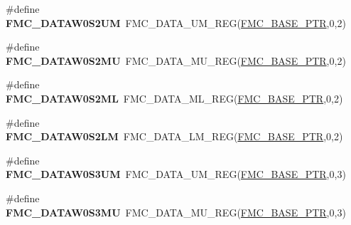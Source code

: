 \begin{DoxyCompactItemize}
\item 
\hypertarget{group___f_m_c___register___accessor___macros_ga2b21b381f94a9e5cbecb7da556720617}{}\#define {\bfseries F\+M\+C\+\_\+\+D\+A\+T\+A\+W0\+S2\+U\+M}~F\+M\+C\+\_\+\+D\+A\+T\+A\+\_\+\+U\+M\+\_\+\+R\+E\+G(\hyperlink{group___f_m_c___peripheral_ga0a740437b573e32e6b932bf729485fd9}{F\+M\+C\+\_\+\+B\+A\+S\+E\+\_\+\+P\+T\+R},0,2)\label{group___f_m_c___register___accessor___macros_ga2b21b381f94a9e5cbecb7da556720617}

\item 
\hypertarget{group___f_m_c___register___accessor___macros_ga6d7f402212e89484959b26b18eac4c8f}{}\#define {\bfseries F\+M\+C\+\_\+\+D\+A\+T\+A\+W0\+S2\+M\+U}~F\+M\+C\+\_\+\+D\+A\+T\+A\+\_\+\+M\+U\+\_\+\+R\+E\+G(\hyperlink{group___f_m_c___peripheral_ga0a740437b573e32e6b932bf729485fd9}{F\+M\+C\+\_\+\+B\+A\+S\+E\+\_\+\+P\+T\+R},0,2)\label{group___f_m_c___register___accessor___macros_ga6d7f402212e89484959b26b18eac4c8f}

\item 
\hypertarget{group___f_m_c___register___accessor___macros_gacb492c1bcd2a892e053c63d2c9d4fdfc}{}\#define {\bfseries F\+M\+C\+\_\+\+D\+A\+T\+A\+W0\+S2\+M\+L}~F\+M\+C\+\_\+\+D\+A\+T\+A\+\_\+\+M\+L\+\_\+\+R\+E\+G(\hyperlink{group___f_m_c___peripheral_ga0a740437b573e32e6b932bf729485fd9}{F\+M\+C\+\_\+\+B\+A\+S\+E\+\_\+\+P\+T\+R},0,2)\label{group___f_m_c___register___accessor___macros_gacb492c1bcd2a892e053c63d2c9d4fdfc}

\item 
\hypertarget{group___f_m_c___register___accessor___macros_ga9522da65975bb1230d82242a2c214c5f}{}\#define {\bfseries F\+M\+C\+\_\+\+D\+A\+T\+A\+W0\+S2\+L\+M}~F\+M\+C\+\_\+\+D\+A\+T\+A\+\_\+\+L\+M\+\_\+\+R\+E\+G(\hyperlink{group___f_m_c___peripheral_ga0a740437b573e32e6b932bf729485fd9}{F\+M\+C\+\_\+\+B\+A\+S\+E\+\_\+\+P\+T\+R},0,2)\label{group___f_m_c___register___accessor___macros_ga9522da65975bb1230d82242a2c214c5f}

\item 
\hypertarget{group___f_m_c___register___accessor___macros_ga5f3eb06b69dc90377c32d923bc897880}{}\#define {\bfseries F\+M\+C\+\_\+\+D\+A\+T\+A\+W0\+S3\+U\+M}~F\+M\+C\+\_\+\+D\+A\+T\+A\+\_\+\+U\+M\+\_\+\+R\+E\+G(\hyperlink{group___f_m_c___peripheral_ga0a740437b573e32e6b932bf729485fd9}{F\+M\+C\+\_\+\+B\+A\+S\+E\+\_\+\+P\+T\+R},0,3)\label{group___f_m_c___register___accessor___macros_ga5f3eb06b69dc90377c32d923bc897880}

\item 
\hypertarget{group___f_m_c___register___accessor___macros_ga4bbf51097b816db5cf8a83657ca7606f}{}\#define {\bfseries F\+M\+C\+\_\+\+D\+A\+T\+A\+W0\+S3\+M\+U}~F\+M\+C\+\_\+\+D\+A\+T\+A\+\_\+\+M\+U\+\_\+\+R\+E\+G(\hyperlink{group___f_m_c___peripheral_ga0a740437b573e32e6b932bf729485fd9}{F\+M\+C\+\_\+\+B\+A\+S\+E\+\_\+\+P\+T\+R},0,3)\label{group___f_m_c___register___accessor___macros_ga4bbf51097b816db5cf8a83657ca7606f}


\end{DoxyCompactItemize}
